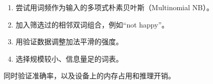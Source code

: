
\begin{enumerate}[start=1]

\item 尝试用词频作为输入的多项式朴素贝叶斯（Multinomial NB）。

\item 加入筛选过的相邻双词组合，例如“not happy”。

\item 用验证数据调整加法平滑的强度。

\item 选择规模较小、信息量足的词表。

\end{enumerate}


同时验证准确率，以及设备上的内存占用和推理开销。
